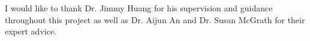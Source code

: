 

\begin{acknowledgements}

I would like to thank Dr. Jimmy Huang for his supervision and guidance throughout this project as well as Dr. Aijun An and Dr. Susan McGrath for their expert advice.

\end{acknowledgements}